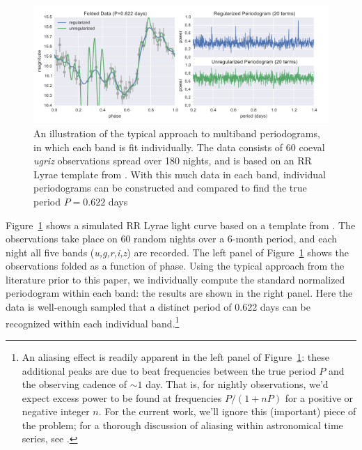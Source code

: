 \documentclass[12pt,preprint]{aastex}
\newcommand{\Fig}[1]{Figure~\ref{fig:#1}}
\newcommand{\fig}[1]{\Fig{#1}}
\newcommand{\figlabel}[1]{\label{fig:#1}}
\begin{document}
\begin{figure}
  \centering
  \includegraphics[width=\textwidth]{fig04.pdf}
  \caption{
    An illustration of the typical approach to multiband periodograms,
    in which each band is fit individually. The data consists of 60 coeval
    {\it ugriz} observations spread over 180 nights, and is based on an
    RR Lyrae template from \citet{Sesar2010}. With this much data in each
    band, individual periodograms can be constructed and compared to find the
    true period $P=0.622$ days
  }
  \figlabel{adhoc_example}
\end{figure}

\fig{adhoc_example} shows a simulated RR Lyrae light curve based on a template from \citet{Sesar2010}. The observations take place on 60 random nights over a 6-month period, and each night all five bands ({\it u,g,r,i,z}) are recorded. The left panel of \fig{adhoc_example} shows the observations folded as a function of phase.
Using the typical approach from the literature prior to this paper, we individually compute the standard normalized periodogram within each band: the results are shown in the right panel. Here the data is well-enough sampled that a distinct period of 0.622 days can be recognized within each individual band.\footnote{\label{foot1}
  An aliasing effect is readily apparent in the left panel of \fig{adhoc_example}: these additional peaks are due to beat frequencies between the true period $P$ and the observing cadence of $\sim 1$ day. That is, for nightly observations, we'd expect excess power to be found at frequencies $P / (1 + nP)$ for a positive or negative integer $n$. For the current work, we'll ignore this (important) piece of the problem; for a thorough discussion of aliasing within astronomical time series, see \citet{Roberts87}.}
\end{document}
